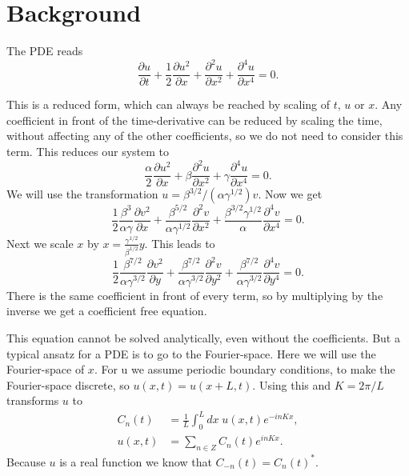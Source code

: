 \section{Background}
The PDE reads
\begin{equation}
  \frac{\partial u }{\partial t} + \frac{1}{2} \frac{\partial u^2 }{\partial x} + \frac{\partial^2 u }{\partial x^2} + \frac{\partial^4 u }{\partial x^4} = 0.\label{eq:PDE}
\end{equation}

This is a reduced form, which can always be reached by scaling of $t$, $u$ or $x$.
Any coefficient in front of the time-derivative can be reduced by scaling the time, without affecting any of the other coefficients, so we do not need to consider this term.
This reduces our system to
\begin{equation}
  \frac{\alpha}{2} \frac{\partial u^2 }{\partial x} + \beta \frac{\partial^2 u }{\partial x^2} + \gamma \frac{\partial^4 u }{\partial x^4} = 0.
\end{equation}
We will use the transformation $ u =\beta^{3/2}/(\alpha \gamma^{1/2}) v $.
Now we get
\begin{equation}
  \frac{1}{2} \frac{\beta^3}{\alpha \gamma} \frac{\partial v^2 }{\partial x} + \frac{\beta^{5/2}}{\alpha \gamma^{1/2}} \frac{\partial^2 v }{\partial x^2} + \frac{\beta^{3/2} \gamma^{1/2}}{\alpha} \frac{\partial^4 v }{\partial x^4} = 0.
\end{equation}
Next we scale $x$ by $ x = \frac{\gamma^{1/2}}{\beta^{1/2}} y $.
This leads to
\begin{equation}
  \frac{1}{2} \frac{\beta^{7/2}}{\alpha \gamma^{3/2}} \frac{\partial v^2 }{\partial y} + \frac{\beta^{7/2}}{\alpha \gamma^{3/2}} \frac{\partial^2 v }{\partial y^2} + \frac{\beta^{7/2}}{\alpha \gamma^{3/2}} \frac{\partial^4 v }{\partial y^4} = 0.
\end{equation}
There is the same coefficient in front of every term, so by multiplying by the inverse we get a coefficient free equation.

This equation cannot be solved analytically, even without the coefficients.
But a typical ansatz for a PDE is to go to the Fourier-space.
Here we will use the Fourier-space of $x$.
For u we assume periodic boundary conditions, to make the Fourier-space discrete, so $ u(x, t) = u(x + L, t) $.
Using this and $ K = 2 \pi/L $ transforms $u$ to
\begin{align}
  C_n(t) & = \frac{1}{L} \int_0^L dx \; u(x,t) e^{-in K x}, \\
  u(x, t) & = \sum_{n \in Z} C_n (t) e^{in K x}. \label{eq:inverse}
\end{align}
Because $u$ is a real function we know that $C_{-n}(t) = {C_n(t)}^{*}$.

